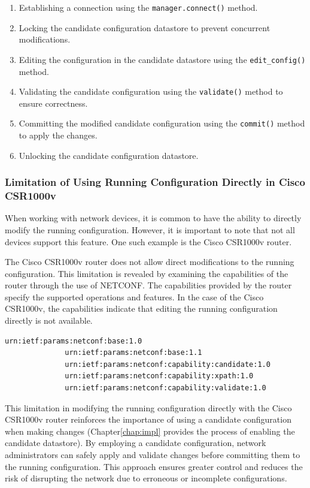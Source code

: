 \begin{enumerate}
  \item Establishing a connection using the \texttt{manager.connect()} method.
  \item Locking the candidate configuration datastore to prevent concurrent modifications.
  \item Editing the configuration in the candidate datastore using the \texttt{edit\_config()} method.
  \item Validating the candidate configuration using the \texttt{validate()} method to ensure correctness.
  \item Committing the modified candidate configuration using the \texttt{commit()} method to apply the changes.
  \item Unlocking the candidate configuration datastore.
\end{enumerate}

\subsubsection{Limitation of Using Running Configuration Directly in Cisco CSR1000v}

When working with network devices, it is common to have the ability to directly modify the running configuration. However, it is important to note that not all devices support this feature. One such example is the Cisco CSR1000v router.

The Cisco CSR1000v router does not allow direct modifications to the running configuration. This limitation is revealed by examining the capabilities of the router through the use of NETCONF. The capabilities provided by the router specify the supported operations and features. In the case of the Cisco CSR1000v, the capabilities indicate that editing the running configuration directly is not available.

\begin{lstlisting}[style=pythonStyle, caption={Router CSR1000v capabilities.}, backgroundcolor=\color{codebackground}]
              urn:ietf:params:netconf:base:1.0
              urn:ietf:params:netconf:base:1.1
              urn:ietf:params:netconf:capability:candidate:1.0
              urn:ietf:params:netconf:capability:xpath:1.0
              urn:ietf:params:netconf:capability:validate:1.0
\end{lstlisting}

This limitation in modifying the running configuration directly with the Cisco CSR1000v router reinforces the importance of using a candidate configuration when making changes (Chapter\ref{chap:impl} provides the process of enabling the candidate datastore). By employing a candidate configuration, network administrators can safely apply and validate changes before committing them to the running configuration. This approach ensures greater control and reduces the risk of disrupting the network due to erroneous or incomplete configurations.

